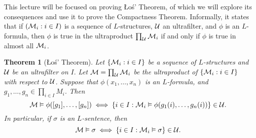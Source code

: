 \documentclass[10pt]{article}
\theoremstyle{newstyle}
\newtheorem{thm}{Theorem}[section]
\begin{document}
This lecture will be focused on proving \L{}o\'s' Theorem, of which we will explore 
its consequences and use it to prove the Compactness Theorem. 
Informally, it states that if $({\cal M}_i : i \in I)$ is a sequence of 
$L$-structures, ${\cal U}$ an ultrafilter, and $\phi$ is an $L$-formula, then 
$\phi$ is true in the ultraproduct $\prod_{\cal U} {\cal M}_i$ if and only if 
$\phi$ is true in almost all ${\cal M}_i$. 

\begin{thm}[\L{}o\'s' Theorem]
Let $\{{\cal M}_i : i \in I\}$ be a sequence of $L$-structures and ${\cal U}$ be an ultrafilter on $I$. 
Let ${\cal M} = \prod_{\cal U} {\cal M}_i$ be the ultraproduct of $\{{\cal M}_i 
: i \in I\}$ with respect to ${\cal U}$. Suppose that $\phi(x_1, \dots, x_n)$ is an 
$L$-formula, and $g_1, \dots, g_n \in \prod_{i \in I} M_i$. Then 
\[ {\cal M} \vDash \phi([g_1], \dots, [g_n]) \iff \{i \in I : {\cal M}_i \vDash 
\phi(g_1(i), \dots, g_n(i))\} \in {\cal U}. \]
In particular, if $\sigma$ is an $L$-sentence, then 
\[ {\cal M} \vDash \sigma \iff \{i \in I : {\cal M}_i \vDash \sigma\} \in {\cal U}. \]
\end{thm}
\end{document}
